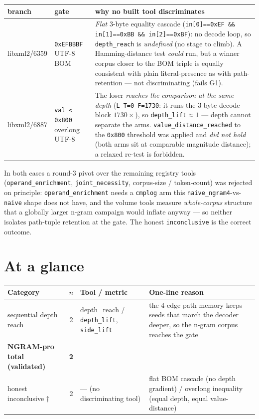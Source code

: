 \documentclass[11pt]{article}
\begin{document}
\begin{center}\small
\begin{tabular}{@{}llp{8.4cm}@{}}
\toprule
\textbf{branch} & \textbf{gate} & \textbf{why no built tool discriminates} \\
\midrule
libxml2/6359 & \texttt{0xEFBBBF} UTF-8 BOM &
\emph{Flat} 3-byte equality cascade (\texttt{in[0]==0xEF \&\& in[1]==0xBB \&\& in[2]==0xBF}): no decode loop, so \texttt{depth\_reach} is \emph{undefined} (no stage to climb). A Hamming-distance test \emph{could} run, but a winner corpus closer to the BOM triple is equally consistent with plain literal-presence as with path-retention --- not discriminating (fails G1). \\
libxml2/6887 & \texttt{val < 0x800} overlong UTF-8 &
The loser \emph{reaches the comparison at the same depth} (\texttt{L T=0 F=1730}: it runs the 3-byte decode block $1730\times$), so \texttt{depth\_lift}$\approx1$ --- depth cannot separate the arms. \texttt{value\_distance\_reached} to the \texttt{0x800} threshold was applied and \emph{did not hold} (both arms sit at comparable magnitude distance); a relaxed re-test is forbidden. \\
\bottomrule
\end{tabular}
\end{center}

\noindent In both cases a round-3 pivot over the remaining registry tools
(\texttt{operand\_enrichment}, \texttt{joint\_necessity}, corpus-size / token-count)
was rejected on principle: \texttt{operand\_enrichment} needs a \texttt{cmplog}
arm this \texttt{naive\_ngram4}-vs-\texttt{naive} shape does not have, and the
volume tools measure \emph{whole-corpus} structure that a globally larger n-gram
campaign would inflate anyway --- so neither isolates path-tuple retention at the
gate. The honest \texttt{inconclusive} is the correct outcome.

\section*{At a glance}
\begin{center}\small
\begin{tabular}{@{}p{3.8cm}clp{4.8cm}@{}}
\toprule
\textbf{Category} & \textbf{$n$} & \textbf{Tool / metric} & \textbf{One-line reason} \\
\midrule
sequential depth reach & 2 & depth\_reach / \texttt{depth\_lift}, \texttt{side\_lift} & the 4-edge path memory keeps seeds that march the decoder deeper, so the n-gram corpus reaches the gate \\
\midrule
\textbf{NGRAM-pro total (validated)} & \textbf{2} & & \\
\midrule
honest inconclusive $\dagger$ & 2 & --- (no discriminating tool) & flat BOM cascade (no depth gradient) / overlong inequality (equal depth, equal value-distance) \\
\bottomrule
\end{tabular}
\end{center}
\end{document}
